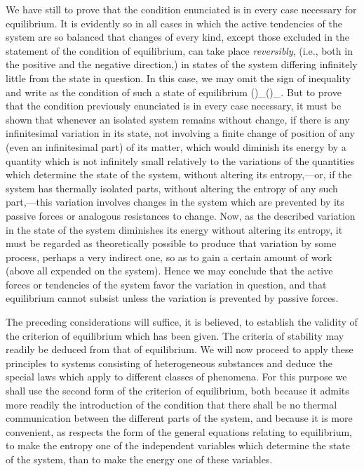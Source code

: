 \documentclass[12pt]{article}
\begin{document}
We have still to prove that the condition enunciated is in every case necessary for equilibrium. It is evidently so in all cases in which the active tendencies of the system are so balanced that changes of every kind, except those excluded in the statement of the condition of equilibrium, can take place \textit{reversibly}, (i.e., both in the positive and the negative direction,) in states of the system differing infinitely little from the state in question. In this case, we may omit the sign of inequality and write as the condition of such a state of equilibrium
\eqs
(\delta \eta)_(\delta \epsilon)_. \label{10}  
\eqe
But to prove that the condition previously enunciated is in every case necessary, it must be shown that whenever an isolated system remains without change, if there is any infinitesimal variation in its state, not involving a finite change of position of any (even an infinitesimal part) of its matter, which would diminish its energy by a quantity which is not infinitely small relatively to the variations of the quantities which determine the state of the system, without altering its entropy,---or, if the system has thermally isolated parts, without altering the entropy of any such part,---this variation involves changes in the system which are prevented by its passive forces or analogous resistances to change. Now, as the described variation in the state of the system diminishes its energy without altering its entropy, it must be regarded as theoretically possible to produce that variation by some process, perhaps a very indirect one, so as to gain a certain amount of work (above all expended on the system). Hence we may conclude that the active forces or tendencies of the system favor the variation in question, and that equilibrium cannot subsist unless the variation is prevented by passive forces.

The preceding considerations will suffice, it is believed, to establish the validity of the criterion of equilibrium which has been given. The criteria of stability may readily be deduced from that of equilibrium. We will now proceed to apply these principles to systems consisting of heterogeneous substances and deduce the special laws which apply to different classes of phenomena. For this purpose we shall use the second form of the criterion of equilibrium, both because it admits more readily the introduction of the condition that there shall be no thermal communication between the different parts of the system, and because it is more convenient, as respects the form of the general equations relating to equilibrium, to make the entropy one of the independent variables which determine the state of the system, than to make the energy one of these variables.
\end{document}
